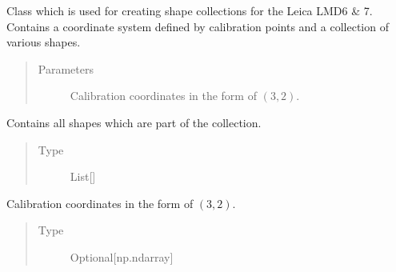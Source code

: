 \documentclass[letterpaper,10pt,english,openany,oneside]{sphinxmanual}
\begin{document}
\begin{fulllineitems}
\label{\detokenize{pages/modules:lmd.lib.Collection}}
\sphinxAtStartPar
Class which is used for creating shape collections for the Leica LMD6 \& 7. Contains a coordinate system defined by calibration points and a collection of various shapes.
\begin{quote}\begin{description}
\item[{Parameters}] \leavevmode
\sphinxAtStartPar
{} \textendash{} Calibration coordinates in the form of \((3, 2)\).

\end{description}\end{quote}

\begin{fulllineitems}
\label{\detokenize{pages/modules:lmd.lib.Collection.shapes}}
\sphinxAtStartPar
Contains all shapes which are part of the collection.
\begin{quote}\begin{description}
\item[{Type}] \leavevmode
\sphinxAtStartPar
List{[}{\hyperref[\detokenize{pages/modules:lmd.lib.Shape}]{}}{]}

\end{description}\end{quote}

\end{fulllineitems}


\begin{fulllineitems}
\label{\detokenize{pages/modules:lmd.lib.Collection.calibration_points}}
\sphinxAtStartPar
Calibration coordinates in the form of \((3, 2)\).
\begin{quote}\begin{description}
\item[{Type}] \leavevmode
\sphinxAtStartPar
Optional{[}np.ndarray{]}


\end{description}
\end{quote}
\end{fulllineitems}
\end{fulllineitems}
\end{document}
